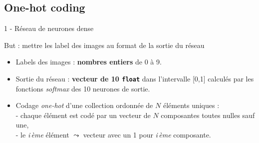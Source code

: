 \documentclass[10pt,serif,mathserif,compress,hyperref={colorlinks}]{beamer}
\begin{document}
\subsection{One-hot coding}

\begin{frame}{1 - Réseau de neurones dense}

  \begin{tcolorbox}[title=Codage {\em One-hot} des labels]  

    But : mettre les label des images au format de la sortie du réseau

    {\small
        \begin{itemize}
        \item Labels des images  : \textbf{nombres entiers} de 0 à 9.
        \item Sortie du réseau : \textbf{vecteur de 10 \texttt{float}} dans l'intervalle [0,1] calculés par les fonctions {\em softmax} des 10 neurones de sortie.
        \item Codage {\em one-hot} d'une collection ordonnée de $N$ éléments uniques : \\[1mm]
          - chaque élément est codé par un vecteur de $N$ composantes toutes nulles sauf une,\\
          - le {\em i\,ème} élément $\leadsto$ vecteur avec un 1 pour {\em i\,ème} composante.
        \end{itemize}
      }
  \end{tcolorbox}  


\end{frame}
\end{document}
